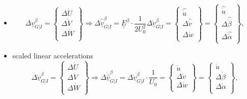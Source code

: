 \begin{itemize}
    \item
    \begin{equation}
        \Delta \underline{v}_{G|I}^\beta  = \begin{Bmatrix}
            \Delta \dot U\\
            \Delta \dot V\\
            \Delta \dot W\\
        \end{Bmatrix} \Rightarrow 
        \Delta \underline{\hat{\dot v}}_{G|I}^\beta  = \underline{\underline{E}}^\beta \cdot \frac{1}{2U_0^2}\Delta \underline{\dot v}_{G|I}^\beta  =\begin{Bmatrix}
            \hat{\dot u}\\
            \Delta \hat{\dot v}\\
            \Delta \hat{\dot w}\\
        \end{Bmatrix}=\begin{Bmatrix}
            \hat{\dot u}\\
            \Delta \hat{\dot \beta}\\
            \Delta \hat{\dot \alpha}\\
        \end{Bmatrix},
    \end{equation}
    
     \item scaled linear accelerations
     \begin{equation}
        \Delta \underline{\dot v}_{G|I}^\beta  = \begin{Bmatrix}
            \Delta \dot{U}\\
            \Delta \dot{V}\\
            \Delta \dot{W}\\
        \end{Bmatrix} \Rightarrow 
        \Delta \underline{\dot{\hat{v}}}_{G|I}^\beta  = \Delta \underline{\dot v}_{G|I}^\beta \cdot \frac{1}{U_0} =\begin{Bmatrix}
            \dot u\\
            \Delta \dot v\\
            \Delta \dot w\\
        \end{Bmatrix}=\begin{Bmatrix}
            \dot u\\
            \Delta \dot \beta\\
            \Delta \dot \alpha\\
        \end{Bmatrix},
    \end{equation}
\end{itemize}

